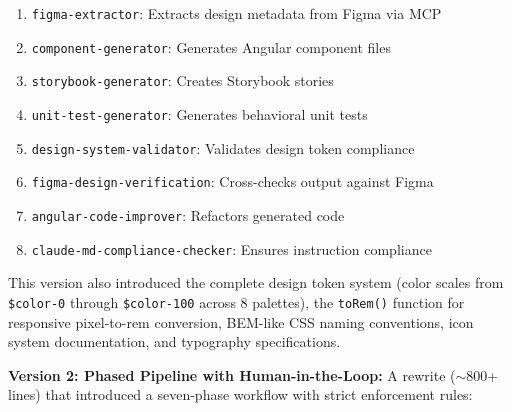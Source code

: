 \begin{enumerate}
    \item \texttt{figma-extractor}: Extracts design metadata from Figma via MCP
    \item \texttt{component-generator}: Generates Angular component files
    \item \texttt{storybook-generator}: Creates Storybook stories
    \item \texttt{unit-test-generator}: Generates behavioral unit tests
    \item \texttt{design-system-validator}: Validates design token compliance
    \item \texttt{figma-design-verification}: Cross-checks output against Figma
    \item \texttt{angular-code-improver}: Refactors generated code
    \item \texttt{claude-md-compliance-checker}: Ensures instruction compliance
\end{enumerate}

This version also introduced the complete design token system (color scales from \texttt{\$color-0} through \texttt{\$color-100} across 8 palettes), the \texttt{toRem()} function for responsive pixel-to-rem conversion, BEM-like CSS naming conventions, icon system documentation, and typography specifications.

\textbf{Version 2: Phased Pipeline with Human-in-the-Loop:} A rewrite ($\sim$800+ lines) that introduced a seven-phase workflow with strict enforcement rules:

